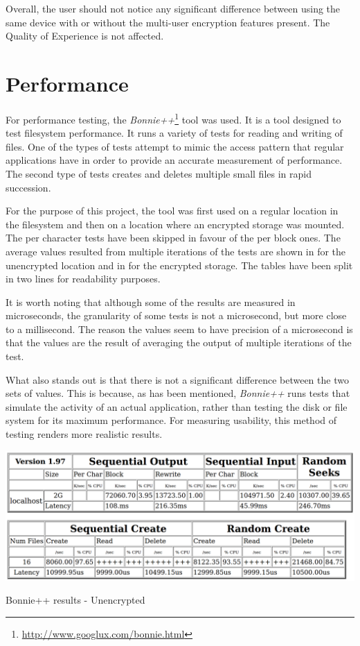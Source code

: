 Overall, the user should not notice any significant difference between using the same device with or without the multi-user encryption features present. The Quality of Experience is not affected.

\section{Performance}
\label{sec:perf-eval}

For performance testing, the \textit{Bonnie++}\footnote{\url{http://www.googlux.com/bonnie.html}} tool was used. It is a tool designed to test filesystem performance. It runs a variety of tests for reading and writing of files. One of the types of tests attempt to mimic the access pattern that regular applications have in order to provide an accurate measurement of performance. The second type of tests creates and deletes multiple small files in rapid succession.

For the purpose of this project, the tool was first used on a regular location in the filesystem and then on a location where an encrypted storage was mounted. The per character tests have been skipped in favour of the per block ones. The average values resulted from multiple iterations of the tests are shown in  for the unencrypted location and in  for the encrypted storage. The tables have been split in two lines for readability purposes.

It is worth noting that although some of the results are measured in microseconds, the granularity of some tests is not a microsecond, but more close to a millisecond. The reason the values seem to have precision of a microsecond is that the values are the result of averaging the output of multiple iterations of the test.
\newpage

What also stands out is that there is not a significant difference between the two sets of values. This is because, as has been mentioned, \textit{Bonnie++} runs tests that simulate the activity of an actual application, rather than testing the disk or file system for its maximum performance. For measuring usability, this method of testing renders more realistic results.

\begin{table}[ht]
\centering
    \includegraphics[width=\textwidth]{src/img/perf/results.pdf}
\caption{Bonnie++ results - Unencrypted}
\label{tbl:res-unenc-eval}
\end{table}

